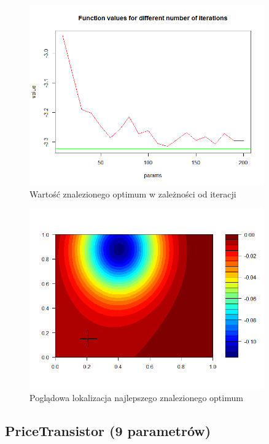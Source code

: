 \documentclass[11pt, a4paper]{article}
\begin{document}
\begin{figure}[H]
	\begin{center}
		\includegraphics[width=0.9\textwidth]{./assets/Hartman66.png} %
		\caption{Wartość znalezionego optimum w zależności od iteracji}
		\label{fig:gulf7}
	\end{center}
\end{figure}
\begin{figure}[H]
	\begin{center}
		\includegraphics[width=0.9\textwidth]{./assets/Hartman67.png} %
		\caption{Poglądowa lokalizacja najlepszego znalezionego optimum}
		\label{fig:gulf7}
	\end{center}
\end{figure}



\subsection{PriceTransistor (9 parametrów)}
\end{document}
